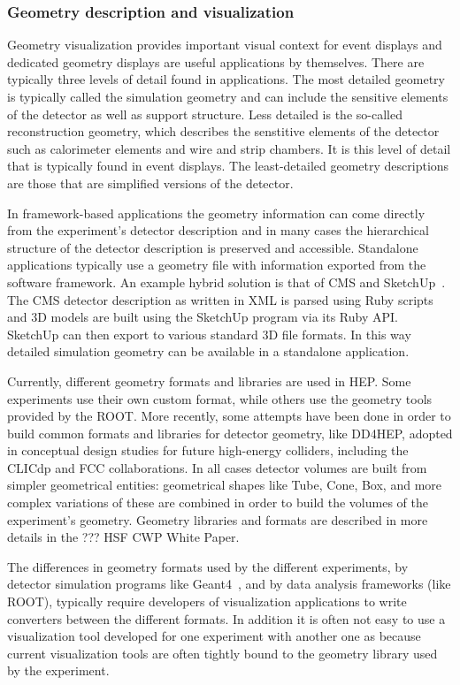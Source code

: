 \documentclass[12pt,a4paper]{article}
\begin{document}
\hypertarget{geometry-description}{%
\subsubsection{Geometry description and visualization}\label{geometry-description}}

Geometry visualization provides important visual context for event displays and dedicated geometry displays are useful applications by themselves.
There are typically three levels of detail found in applications. The most detailed geometry is typically called the simulation geometry
and can include the sensitive elements of the detector as well as support structure. Less detailed is the so-called reconstruction
geometry, which describes the senstitive elements of the detector such as calorimeter elements and wire and strip chambers. It is this level of
detail that is typically found in event displays. The least-detailed geometry descriptions are those that are simplified versions of the
detector.

In framework-based applications the geometry information can come directly from the experiment's detector description and in
 many cases the hierarchical structure of the detector description is preserved and accessible. Standalone applications
typically use a geometry file with information exported from the software framework. An example hybrid solution is that of CMS and SketchUp~\cite{CMSSketchUp}.
The CMS detector description as written in XML is parsed using Ruby scripts and 3D models are built using the SketchUp program via its
Ruby API. SketchUp can then export to various standard 3D file formats. In this way detailed simulation geometry can be available in a standalone
application.


Currently, different geometry formats and libraries are used in HEP.
Some experiments use their own custom format, while others use the geometry tools provided by the ROOT. More recently, some attempts have been
done in order to build common formats and libraries for detector geometry, like DD4HEP,  adopted in conceptual design studies
for future high-energy colliders, including the CLICdp and FCC collaborations. In all cases detector
volumes are built from simpler geometrical entities: geometrical shapes like Tube, Cone, Box, and more complex variations of these
are combined in order to build the volumes of the experiment’s geometry. Geometry libraries and formats are described in more details
in the ??? HSF CWP White Paper.

The differences in geometry formats used by the different experiments, by detector simulation programs like Geant4~\cite{Geant4},
and by data analysis frameworks (like ROOT), typically require developers of visualization applications to write converters
between the different formats. In addition it is often not easy to use a visualization tool developed for one experiment with another one as
because current visualization tools are often tightly bound to the geometry library used by the experiment.
\end{document}
